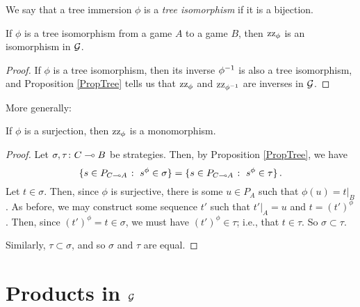 \documentclass[11pt]{report}
\begin{document}
\begin{definition}
  We say that a tree immersion $\phi$ is a \emph{tree isomorphism} if it is a bijection.
\end{definition}

\begin{proposition}
  If $\phi$ is a tree isomorphism from a game $A$ to a game $B$, then $\operatorname{zz}_\phi$ is an isomorphism in $\mathcal G$.
\end{proposition}
\begin{proof}
  If $\phi$ is a tree isomorphism, then its inverse $\phi^{-1}$ is also a tree isomorphism, and Proposition \ref{PropTree} tells us that $\operatorname{zz}_\phi$ and $\operatorname{zz}_{\phi^{-1}}$ are inverses in $\mathcal G$.
\end{proof}

More generally:

\begin{proposition}
  If $\phi$ is a surjection, then $\operatorname{zz}_\phi$ is a monomorphism.
  \label{PropZigzagMono}
\end{proposition}
\begin{proof}
  Let $\sigma,\tau\colon C \multimap B$ be strategies.
  Then, by Proposition \ref{PropTree}, we have
  \[
    \{s\in P_{C\multimap A}\;\colon\; s^\phi\in\sigma\} = \{s\in P_{C\multimap A}\;\colon\; s^\phi\in\tau\}\,.
    \]
  Let $t\in\sigma$.  
  Then, since $\phi$ is surjective, there is some $u\in P_A$ such that $\phi(u)=t\vert_B$.  
  As before, we may construct some sequence $t'$ such that $t'\vert_A=u$ and $t=(t')^\phi$.  
  Then, since $(t')^\phi=t\in\sigma$, we must have $(t')^\phi\in\tau$; i.e., that $t\in\tau$.  
  So $\sigma\subset\tau$.  
  
  Similarly, $\tau\subset\sigma$, and so $\sigma$ and $\tau$ are equal.
\end{proof}

\section{Products in $\mathcal G$}
\end{document}
